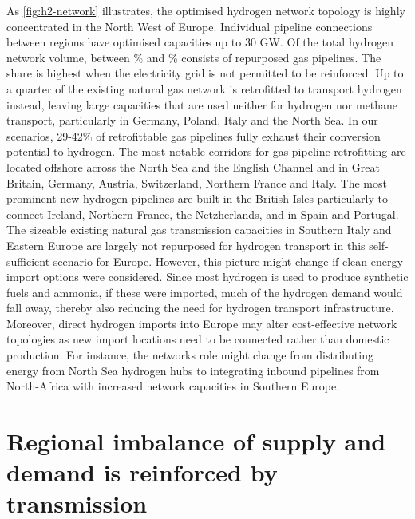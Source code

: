 As \cref{fig:h2-network} illustrates, the optimised hydrogen network topology is
highly concentrated in the North West of Europe. Individual pipeline connections
between regions have optimised capacities up to 30 GW. Of the total hydrogen
network volume, between \minretroshare\% and \maxretroshare\% consists of
repurposed gas pipelines. The share is highest when the electricity grid is not
permitted to be reinforced. Up to a quarter of the existing natural gas network
is retrofitted to transport hydrogen instead, leaving large capacities that are
used neither for hydrogen nor methane transport, particularly in Germany,
Poland, Italy and the North Sea. In our scenarios, 29-42\% of retrofittable gas
pipelines fully exhaust their conversion potential to hydrogen. The most notable
corridors for gas pipeline retrofitting are located offshore across the North
Sea and the English Channel and in Great Britain, Germany, Austria, Switzerland,
Northern France and Italy. The most prominent new hydrogen pipelines are built
in the British Isles particularly to connect Ireland, Northern France, the
Netzherlands, and in Spain and Portugal. The sizeable existing natural gas
transmission capacities in Southern Italy and Eastern Europe are largely not
repurposed for hydrogen transport in this self-sufficient scenario for Europe.
However, this picture might change if clean energy import options were
considered. Since most hydrogen is used to produce synthetic fuels and ammonia,
if these were imported, much of the hydrogen demand would fall away, thereby
also reducing the need for hydrogen transport infrastructure. Moreover, direct
hydrogen imports into Europe may alter cost-effective network topologies as new
import locations need to be connected rather than domestic production. For
instance, the networks role might change from distributing energy from North Sea
hydrogen hubs to integrating inbound pipelines from North-Africa with increased
network capacities in Southern Europe.




\section*{Regional imbalance of supply and demand is reinforced by transmission}
\label{sec:imbalance}

